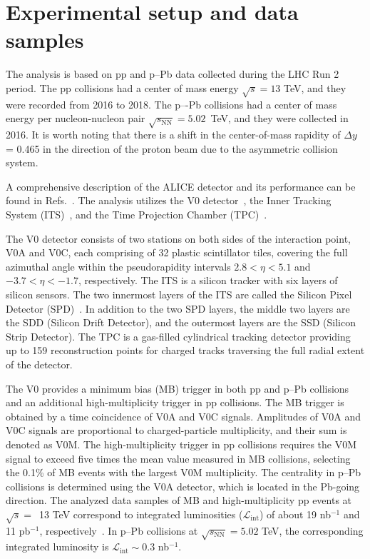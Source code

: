 

\section{Experimental setup and data samples}
\label{sec:experiment}

The analysis is based on pp and p--Pb data collected during the LHC Run 2 period. The pp collisions had a center of mass energy $\sqrt{s} = 13$ TeV, and they were recorded from 2016 to 2018.
The p–-Pb collisions had a center of mass energy per nucleon-nucleon pair $\sqrt{s_\mathrm{NN}} = 5.02$~TeV, and they were collected in 2016. It is worth noting that there is a shift in the center-of-mass rapidity of $\Delta y$ = 0.465 in the direction of the proton beam due to the asymmetric collision system.

A comprehensive description of the ALICE detector and its performance can be found in Refs.~\cite{Aamodt:2008zz, Abelev:2014ffa, ALICE:2022wpn}. The analysis utilizes the V0 detector~\cite{Abbas:2013taa}, the Inner Tracking System (ITS)~\cite{aliceITS, ALICE:2013nwm}, and the Time Projection Chamber (TPC)~\cite{aliceTPC}. 

The V0 detector consists of two stations on both sides of the interaction point, V0A and V0C, each comprising of 32 plastic scintillator tiles, covering the full azimuthal angle within the pseudorapidity intervals $2.8 < \eta < 5.1$ and $-3.7 < \eta < -1.7$, respectively. 
The ITS is a silicon tracker with six layers of silicon sensors. The two innermost layers of the ITS are called the Silicon Pixel Detector (SPD)~\cite{Santoro2009:ALICESPD}. In addition to the two SPD layers, the middle two layers are the SDD (Silicon Drift Detector), and the outermost layers are the SSD (Silicon Strip Detector). The TPC is a gas-filled cylindrical tracking detector providing up to 159 reconstruction points for charged tracks traversing the full radial extent of the detector.

The V0 provides a minimum bias (MB) trigger in both pp and p--Pb collisions and an additional high-multiplicity trigger in pp collisions. The MB trigger is obtained by a time coincidence of V0A and V0C signals. 
Amplitudes of V0A and V0C signals are proportional to charged-particle multiplicity, and their sum is denoted as V0M.  
The high-multiplicity trigger in pp collisions requires the V0M signal to exceed five times the mean value measured in MB collisions, selecting the 0.1\% of MB events with the largest V0M multiplicity. The centrality in p--Pb collisions is determined using the V0A detector, which is located in the Pb-going direction. The analyzed data samples of MB and high-multiplicity pp events at $\sqrt{s}=$~13 TeV correspond to integrated luminosities ($\mathcal{L}_\mathrm{int}$) of about 19 nb$^{-1}$ and 11 pb$^{-1}$, respectively~\cite{ALICE:2016nst}. In p--Pb collisions at $\sqrt{s_\mathrm{NN}} = 5.02$ TeV, the corresponding integrated luminosity is $\mathcal{L}_\mathrm{int} \sim 0.3$ nb$^{-1}$. 

